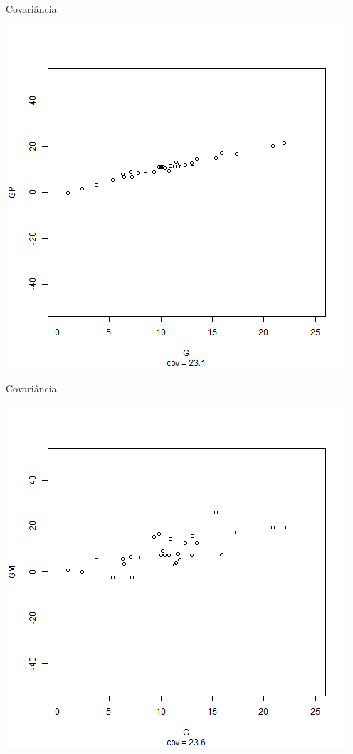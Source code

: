 \documentclass{beamer}
\begin{document}
\begin{frame}{Covariância}
  \begin{center}
    \includegraphics[height=.8\textheight]{Cap17/anim-1}
  \end{center}
\end{frame}

\begin{frame}{Covariância}
  \begin{center}
    \includegraphics[height=.8\textheight]{Cap17/anim-2}
  \end{center}
\end{frame}
\end{document}
